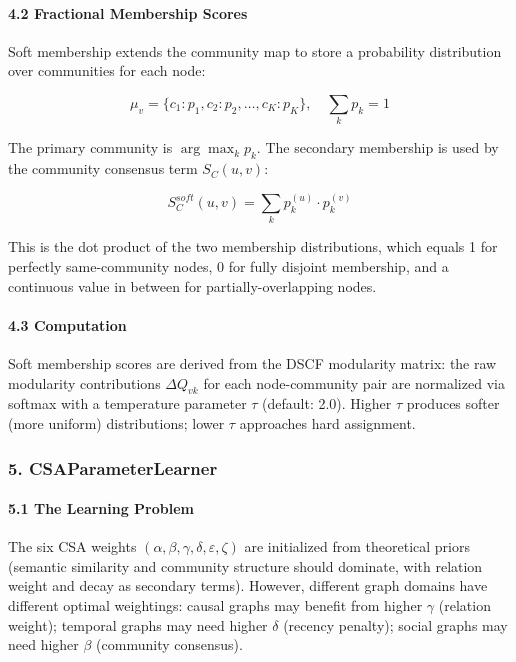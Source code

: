\paragraph{4.2 Fractional Membership Scores}
Soft membership extends the community map to store a probability distr\-ibution over communities for each node:

\begin{equation}
\mu_v = \{c_1: p_1, c_2: p_2, \ldots, c_K: p_K\}, \quad \sum_k p_k = 1
\end{equation}

The primary community is $\arg\max_k p_k$. The secondary membership is used by the community consensus term $S_C(u,v)$:

\begin{equation}
S_C^{soft}(u,v) = \sum_{k} p_k^{(u)} \cdot p_k^{(v)}
\end{equation}

This is the dot product of the two membership distr\-ibutions, which equals 1 for perfectly same-community nodes, 0 for fully disjoint membership, and a continuous value in between for partially-overlapping nodes.

\paragraph{4.3 Computation}
Soft membership scores are derived from the DSCF modularity matrix: the raw modularity contr\-ibutions $\Delta Q_{vk}$ for each node-community pair are normalized via softmax with a temperature parameter $\tau$ (default: 2.0). Higher $\tau$ produces softer (more uniform) distr\-ibutions; lower $\tau$ approaches hard assignment.

\subsubsection{5. CSAParameterLearner}

\paragraph{5.1 The Learning Problem}
The six CSA weights $(\alpha, \beta, \gamma, \delta, \varepsilon, \zeta)$ are initialized from theoretical priors (semantic similarity and community structure should dominate, with relation weight and decay as secondary terms). However, different graph domains have different optimal weightings: causal graphs may benefit from higher $\gamma$ (relation weight); temporal graphs may need higher $\delta$ (recency penalty); social graphs may need higher $\beta$ (community consensus).

